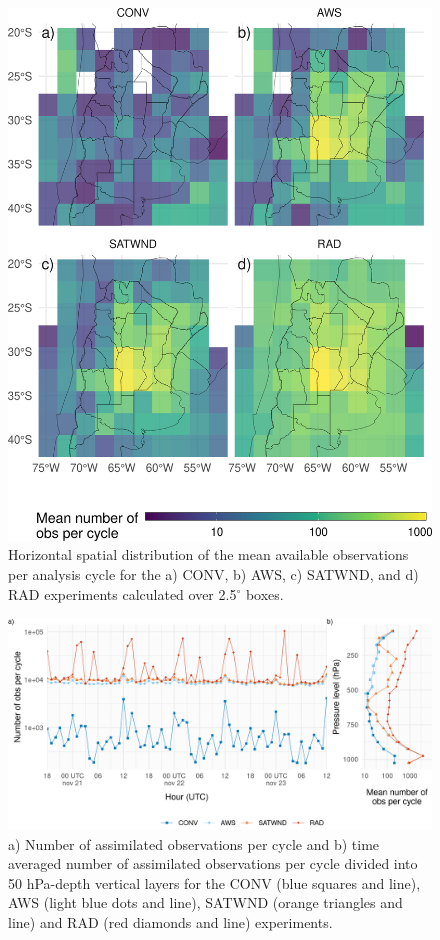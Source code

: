 \documentclass[final,5p,times,twocolumn,authoryear]{elsarticle} %
\begin{document}
\begin{figure}
\includegraphics[width=1\linewidth]{../figures/obs-horizontal-1} \caption{Horizontal spatial distribution of the mean available observations per analysis cycle for the a) CONV, b) AWS, c) SATWND, and d) RAD experiments calculated over 2.5\(^{\circ}\) boxes.}\label{fig:obs-horizontal}
\end{figure}



\begin{figure}
\includegraphics{../figures/obs-cycle-1} \caption{a) Number of assimilated observations per cycle and b) time averaged number of assimilated observations per cycle divided into 50 hPa-depth vertical layers for the CONV (blue squares and line), AWS (light blue dots and line), SATWND (orange triangles and line) and RAD (red diamonds and line) experiments.}\label{fig:obs-cycle}
\end{figure}
\end{document}
